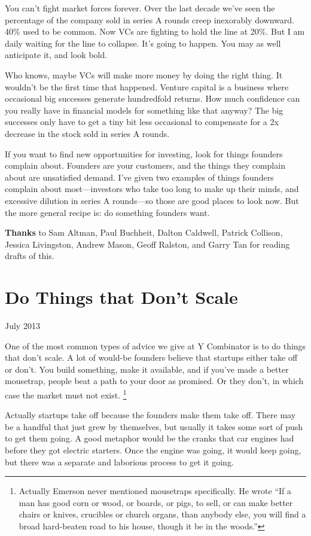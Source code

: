 \documentclass[12pt]{book}
\begin{document}
You can't fight market forces forever. Over the last decade we've seen
the percentage of the company sold in series A rounds creep inexorably
downward. 40\% used to be common. Now VCs are fighting to hold the line
at 20\%. But I am daily waiting for the line to collapse. It's going to
happen. You may as well anticipate it, and look bold.

Who knows, maybe VCs will make more money by doing the right thing. It
wouldn't be the first time that happened. Venture capital is a business
where occasional big successes generate hundredfold returns. How much
confidence can you really have in financial models for something like
that anyway? The big successes only have to get a tiny bit less
occasional to compensate for a 2x decrease in the stock sold in series A
rounds.

If you want to find new opportunities for investing, look for things
founders complain about. Founders are your customers, and the things
they complain about are unsatisfied demand. I've given two examples of
things founders complain about most---investors who take too long to
make up their minds, and excessive dilution in series A rounds---so
those are good places to look now. But the more general recipe is: do
something founders want.


\textbf{Thanks} to Sam Altman, Paul Buchheit, Dalton Caldwell, Patrick
Collison, Jessica Livingston, Andrew Mason, Geoff Ralston, and Garry Tan
for reading drafts of this.
\chapter{Do Things that Don't Scale}

July 2013

One of the most common types of advice we give at Y Combinator is to do
things that don't scale. A lot of would-be founders believe that
startups either take off or don't. You build something, make it
available, and if you've made a better mousetrap, people beat a path to
your door as promised. Or they don't, in which case the market must not
exist. \footnote{Actually Emerson never mentioned mousetraps specifically. He
wrote ``If a man has good corn or wood, or boards, or pigs, to sell, or
can make better chairs or knives, crucibles or church organs, than
anybody else, you will find a broad hard-beaten road to his house,
though it be in the woods.''}

Actually startups take off because the founders make them take off.
There may be a handful that just grew by themselves, but usually it
takes some sort of push to get them going. A good metaphor would be the
cranks that car engines had before they got electric starters. Once the
engine was going, it would keep going, but there was a separate and
laborious process to get it going.
\end{document}
